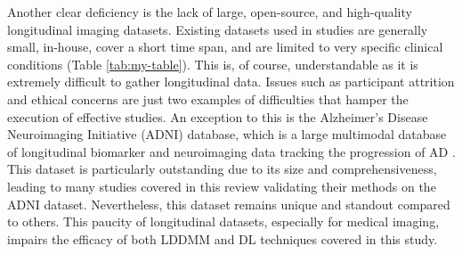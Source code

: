 		Another clear deficiency is the lack of large, open-source, and high-quality longitudinal imaging datasets. Existing datasets used in studies are generally small, in-house, cover a short time span, and are limited to very specific clinical conditions (Table \ref{tab:my-table}). This is, of course, understandable as it is extremely difficult to gather longitudinal data. Issues such as participant attrition \cite{Young2006} and ethical concerns \cite{Tinker2009} are just two examples of difficulties that hamper the execution of effective studies. An exception to this is the Alzheimer's Disease Neuroimaging Initiative (ADNI) database, which is a large multimodal database of longitudinal biomarker and neuroimaging data tracking the progression of AD \cite{Jack2008}. This dataset is particularly outstanding due to its size and comprehensiveness, leading to many studies covered in this review validating their methods on the ADNI dataset. Nevertheless, this dataset remains unique and standout compared to others. This paucity of longitudinal datasets, especially for medical imaging, impairs the efficacy of both LDDMM and DL techniques covered in this study. 
		
